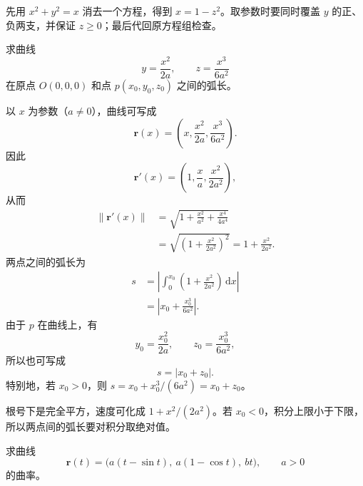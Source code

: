 \begin{dxtips}\label{hw:curves:tip1}
先用 $x^2+y^2=x$ 消去一个方程，得到 $x=1-z^2$。取参数时要同时覆盖 $y$ 的正、负两支，并保证 $z\geq0$；最后代回原方程组检查。
\end{dxtips}

\clearpage

\begin{homework}[教材第 30 页，习题 2.2 第 1 题（5）]
\par\smallskip
求曲线
\[
y=\frac{x^2}{2a},\qquad z=\frac{x^3}{6a^2}
\]
在原点 $O(0,0,0)$ 和点 $p(x_0,y_0,z_0)$ 之间的弧长。
\end{homework}

\begin{solution}
以 $x$ 为参数（$a\neq0$），曲线可写成
\[
\bm r(x)
=\left(x,\frac{x^2}{2a},\frac{x^3}{6a^2}\right).
\]
因此
\[
\bm r'(x)
=\left(1,\frac{x}{a},\frac{x^2}{2a^2}\right),
\]
从而
\begin{align*}
\lVert\bm r'(x)\rVert
&=\sqrt{1+\frac{x^2}{a^2}+\frac{x^4}{4a^4}}\\
&=\sqrt{\left(1+\frac{x^2}{2a^2}\right)^2}
=1+\frac{x^2}{2a^2}.
\end{align*}
两点之间的弧长为
\begin{align*}
s
&=\left|\int_0^{x_0}\left(1+\frac{x^2}{2a^2}\right)\,\mathrm dx\right|\\
&=\boxed{\left|x_0+\frac{x_0^3}{6a^2}\right|}.
\end{align*}
由于 $p$ 在曲线上，有
\[
y_0=\frac{x_0^2}{2a},\qquad
z_0=\frac{x_0^3}{6a^2},
\]
所以也可写成
\[
\boxed{s=|x_0+z_0|}.
\]
特别地，若 $x_0>0$，则 $s=x_0+x_0^3/(6a^2)=x_0+z_0$。
\end{solution}

\begin{dxtips}\label{hw:curves:tip2}
根号下是完全平方，速度可化成 $1+x^2/(2a^2)$。若 $x_0<0$，积分上限小于下限，所以两点间的弧长要对积分取绝对值。
\end{dxtips}

\clearpage

\begin{homework}[教材第 38 页，习题 2.3 第 1 题（3）]
\par\smallskip
求曲线
\[
\bm r(t)
=\bigl(a(t-\sin t),\ a(1-\cos t),\ bt\bigr),
\qquad a>0
\]
的曲率。
\end{homework}

